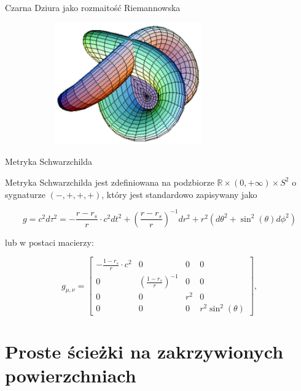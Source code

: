 \documentclass[polish, 9pt, xcolor=table, hyperref={pdfpagemode=FullScreen}]{beamer}
\newcommand{\R}{\mathbb{R}}
\begin{document}
\begin{frame}{Czarna Dziura jako rozmaitość Riemannowska}
\begin{figure}
\begin{subfigure}[b]{0.3\textwidth}
    \end{subfigure}
    \begin{subfigure}[b]{0.3\textwidth}
        \includegraphics[width=0.7\textwidth]{ilustracje/rozmaitosc1.PNG}
    \end{subfigure}
\end{figure}

\end{frame}

\begin{frame}{Metryka Schwarzchilda}

Metryka Schwarzchilda jest zdefiniowana na podzbiorze $\R \times (0, +\infty) \times S^2$ o sygnaturze $(-, +, +, +)$, który jest standardowo zapisywany jako

$$ g = c^2 d \tau^2 = -\frac{r - r_s}{r}\cdot c^2d t^2 + \left( \frac{r - r_s}{r}\right)^{-1} d r^2 + r^2(d \theta^2 + \sin^2(\theta) d \phi^2) $$

lub w postaci macierzy:

$$
g_{\mu, \nu} = \begin{bmatrix}
  -\frac{1 - r_s}{r}\cdot c^2 & 0                               & 0   & 0 \\
  0                 & \left(\frac{1 - r_s}{r}\right)^{-1} & 0   & 0 \\
  0                 & 0                                   & r^2 & 0 \\ 
  0                 & 0                                   & 0   & r^2 \sin^2(\theta)
\end{bmatrix}, 
$$

\end{frame}

\section{Proste ścieżki na zakrzywionych powierzchniach}
\end{document}
